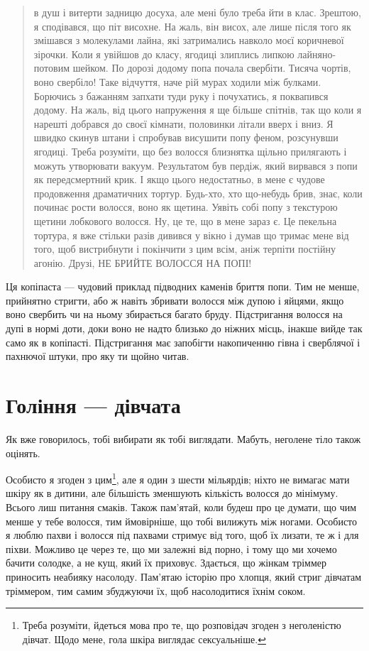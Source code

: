 \begin{quote}
в душ і витерти задницю досуха, але мені було треба йти в клас. Зрештою, я
сподівався, що піт висохне. На жаль, він висох, але лише після того як змішався
з молекулами лайна, які затримались навколо моєї коричневої зірочки. Коли я
увійшов до класу, ягодиці злиплись липкою лайняно-потовим шейком. По дорозі
додому попа почала свербіти. Тисяча чортів, воно свербіло! Таке відчуття, наче
рій мурах ходили між булками. Борючись з бажанням запхати туди руку і
почухатись, я поквапився додому. На жаль, від цього напруження я ще більше
спітнів, так що коли я нарешті добрався до своєї кімнати, половинки літали
вверх і вниз. Я швидко скинув штани і спробував висушити попу феном, розсунувши
ягодиці. Треба розуміти, що без волосся близнятка щільно прилягають і можуть
утворювати вакуум. Результатом був пердіж, який вирвався з попи як
передсмертний крик. І якщо цього недостатньо, в мене є чудове продовження
драматичних тортур. Будь-хто, хто що-небудь брив, знає, коли починає рости
волосся, воно як щетина. Уявіть собі попу з текстурою щетини лобкового волосся.
Ну, це те, що в мене зараз є. Це пекельна тортура, я вже стільки разів дивився
у вікно і думав що тримає мене від того, щоб вистрибнути і покінчити з цим
всім, аніж терпіти постійну агонію. Друзі, НЕ БРИЙТЕ ВОЛОССЯ НА ПОПІ!
\end{quote}

Ця копіпаста — чудовий приклад підводних каменів бриття попи. Тим не менше,
прийнятно стригти, або ж навіть збривати волосся між дупою і яйцями, якщо
воно свербить чи на ньому збирається багато бруду. Підстригання волосся на
дупі в нормі доти, доки воно не надто близько до ніжних місць, інакше вийде
так само як в копіпасті. Підстригання має запобігти накопиченню гівна і
сверблячої і пахнючої штуки, про яку ти щойно читав.

\section{Гоління — дівчата}
Як вже говорилось, тобі вибирати як тобі виглядати. Мабуть, неголене тіло
також оцінять.

Особисто я згоден з цим\footnote{Треба розуміти, йдеться мова про те, що
розповідач згоден з неголеністю дівчат. Щодо мене, гола шкіра виглядає
сексуальніше.}, але я один з шести мільярдів; ніхто не вимагає мати шкіру як
в дитини, але більшість зменшують кількість волосся до мінімуму. Всього лиш
питання смаків. Також пам’ятай, коли будеш про це думати, що чим менше у тебе
волосся, тим ймовірніше, що тобі вилижуть між ногами. Особисто я люблю пахви
і волосся під пахвами стримує від того, щоб їх лизати, те ж і для піхви.
Можливо це через те, що ми залежні від порно, і тому що ми хочемо бачити
солодке, а не кущ, який їх приховує. Здається, що жінкам тріммер приносить
неабияку насолоду. Пам’ятаю історію про хлопця, який стриг дівчатам тріммером,
тим самим збуджуючи їх, щоб насолодитися їхнім соком.

